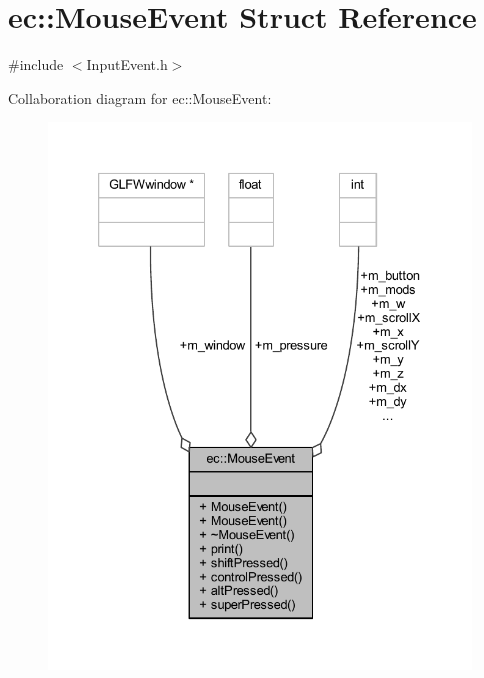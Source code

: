 \hypertarget{structec_1_1_mouse_event}{}\section{ec\+:\+:Mouse\+Event Struct Reference}
\label{structec_1_1_mouse_event}


{\ttfamily \#include $<$Input\+Event.\+h$>$}



Collaboration diagram for ec\+:\+:Mouse\+Event\+:\nopagebreak
\begin{figure}[H]
\begin{center}
\leavevmode
\includegraphics[width=333pt]{structec_1_1_mouse_event__coll__graph}
\end{center}
\end{figure}
